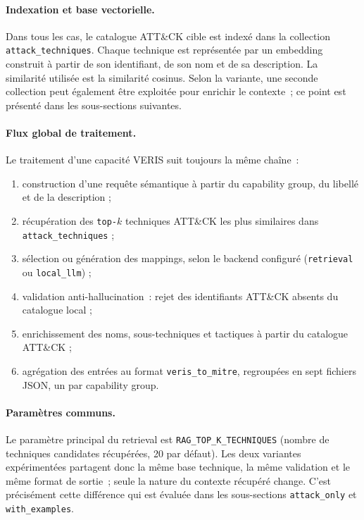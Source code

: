 \documentclass[a4paper,12pt]{article}
\begin{document}
\paragraph{Indexation et base vectorielle.}
Dans tous les cas, le catalogue ATT\&CK cible est indexé dans la collection
\texttt{attack\_techniques}. Chaque technique est représentée par un embedding
construit à partir de son identifiant, de son nom et de sa description. La
similarité utilisée est la similarité cosinus. Selon la variante, une seconde
collection peut également être exploitée pour enrichir le contexte~; ce point
est présenté dans les sous-sections suivantes.

\paragraph{Flux global de traitement.}
Le traitement d'une capacité VERIS suit toujours la même chaîne~:
\begin{enumerate}
    \item construction d'une requête sémantique à partir du capability group,
          du libellé et de la description ;
    \item récupération des \texttt{top-$k$} techniques ATT\&CK les plus
          similaires dans \texttt{attack\_techniques} ;
    \item sélection ou génération des mappings, selon le backend configuré
          (\texttt{retrieval} ou \texttt{local\_llm}) ;
    \item validation anti-hallucination~: rejet des identifiants ATT\&CK absents
          du catalogue local ;
    \item enrichissement des noms, sous-techniques et tactiques à partir du
          catalogue ATT\&CK ;
    \item agrégation des entrées au format \texttt{veris\_to\_mitre}, regroupées
          en sept fichiers JSON, un par capability group.
\end{enumerate}

\paragraph{Paramètres communs.}
Le paramètre principal du retrieval est \texttt{RAG\_TOP\_K\_TECHNIQUES}
(nombre de techniques candidates récupérées, 20 par défaut). Les deux variantes
expérimentées partagent donc la même base technique, la même validation et le
même format de sortie~; seule la nature du contexte récupéré change. C'est
précisément cette différence qui est évaluée dans les sous-sections
\texttt{attack\_only} et \texttt{with\_examples}.
\end{document}

